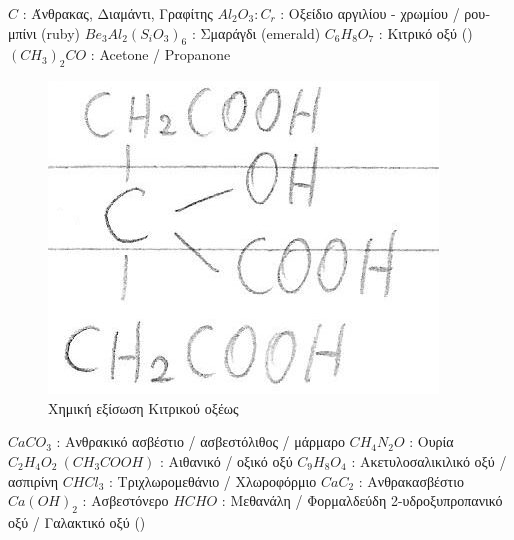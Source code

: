 \documentclass[12pt]{article}
\begin{document}
\begin{flushleft}
	\textbullet \quad $\displaystyle C$  :  \textgreek{Άνθρακας, Διαμάντι, Γραφίτης} \linebreak 
	\textbullet \quad $\displaystyle Al_2O_3:C_r$  :  \textgreek{Οξείδιο αργιλίου - χρωμίου / ρουμπίνι (ruby)} \linebreak 
	\textbullet \quad $\displaystyle Be_3Al_2(S_iO_3)_6$  :  \textgreek{Σμαράγδι (emerald)} \linebreak 
	\textbullet \quad $\displaystyle C_6H_8O_7 $  :  \textgreek{Κιτρικό οξύ} () \linebreak 
	\textbullet \quad $\displaystyle (CH_3)_2 CO$  :  Acetone / Propanone \linebreak 
	
	\begin{figure}[H]
	\centering
	\includegraphics[scale=1]{citricAcid}
	\caption{\textgreek{Χημική εξίσωση Κιτρικού οξέως}}
	\label{fig:citricAcid}
	\end{figure}
	
	\textbullet \quad $\displaystyle CaCO_3$  :  \textgreek{Ανθρακικό ασβέστιο / ασβεστόλιθος / μάρμαρο} \linebreak 
	\textbullet \quad $\displaystyle CH_4N_2O$  :  \textgreek{Ουρία} \linebreak 
	\textbullet \quad $\displaystyle C_2H_4O_2 \ (CH_3COOH) $  :  \textgreek{Αιθανικό / οξικό οξύ} \linebreak 
	\textbullet \quad $\displaystyle C_9H_8O_4$  :  \textgreek{Ακετυλοσαλικιλικό οξύ / ασπιρίνη} \linebreak 
	\textbullet \quad $\displaystyle CHCl_3$  :  \textgreek{Τριχλωρομεθάνιο / Χλωροφόρμιο} \linebreak 
	\textbullet \quad $\displaystyle CaC_2$  :  \textgreek{Ανθρακασβέστιο} \linebreak 
	\textbullet \quad $\displaystyle Ca(OH)_2$  :  \textgreek{Ασβεστόνερο} \linebreak 
	\textbullet \quad $\displaystyle HCHO$  :  \textgreek{Μεθανάλη / Φορμαλδεύδη} \linebreak 
	\textbullet \quad \textgreek{2-υδροξυπροπανικό οξύ / Γαλακτικό οξύ} () \linebreak 
	

\end{flushleft}
\end{document}
